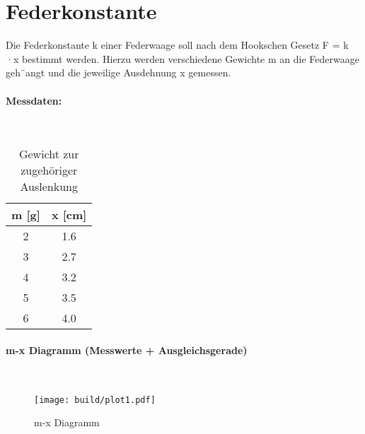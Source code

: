 \section{Federkonstante}
Die Federkonstante k einer Federwaage soll nach dem Hookschen Gesetz F =
k ·x bestimmt werden. Hierzu werden verschiedene Gewichte m an die Federwaage geh¨angt und die jeweilige Ausdehnung x gemessen.

\paragraph{Messdaten:} \mbox{} \\

\begin{table}
    \centering
    \caption{Gewicht zur zugehöriger Auslenkung}
    \label{tab:Gewicht}
        \begin{tabular}{c c}
        \toprule
        m [g] & x [cm] \\
        \midrule
        2 & 1.6      \\
        3 & 2.7     \\
        4 & 3.2   \\
        5 & 3.5  \\
        6 & 4.0 \\
        \bottomrule
    \end{tabular}
\end{table}

\paragraph{m-x Diagramm (Messwerte + Ausgleichsgerade)} \mbox{} \\

\begin{figure}
    \centering
    \texttt{[image: build/plot1.pdf]}
    \caption{m-x Diagramm}
    \label{fig:plot1}
\end{figure}
